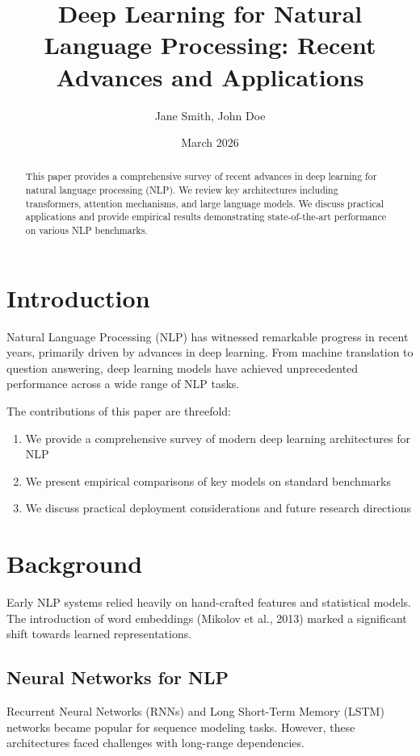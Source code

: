 \documentclass{article}
\title{Deep Learning for Natural Language Processing: Recent Advances and Applications}
\author{Jane Smith, John Doe}
\date{March 2026}
\begin{document}
\maketitle

\begin{abstract}
This paper provides a comprehensive survey of recent advances in deep learning for natural language processing (NLP). We review key architectures including transformers, attention mechanisms, and large language models. We discuss practical applications and provide empirical results demonstrating state-of-the-art performance on various NLP benchmarks.
\end{abstract}

\section{Introduction}

Natural Language Processing (NLP) has witnessed remarkable progress in recent years, primarily driven by advances in deep learning. From machine translation to question answering, deep learning models have achieved unprecedented performance across a wide range of NLP tasks.

The contributions of this paper are threefold:
\begin{enumerate}
\item We provide a comprehensive survey of modern deep learning architectures for NLP
\item We present empirical comparisons of key models on standard benchmarks
\item We discuss practical deployment considerations and future research directions
\end{enumerate}

\section{Background}

Early NLP systems relied heavily on hand-crafted features and statistical models. The introduction of word embeddings (Mikolov et al., 2013) marked a significant shift towards learned representations.

\subsection{Neural Networks for NLP}

Recurrent Neural Networks (RNNs) and Long Short-Term Memory (LSTM) networks became popular for sequence modeling tasks. However, these architectures faced challenges with long-range dependencies.
\end{document}
